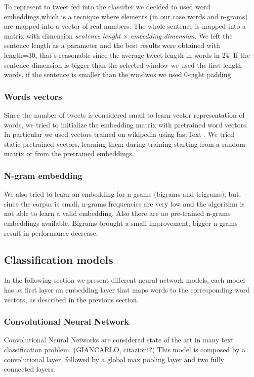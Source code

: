To represent to tweet fed into the classifier we decided to used word embeddings,which is a tecnique where elements (in our case words and n-grams) are mapped into a vector of real numbers.
The whole sentence is mapped into a matrix with dimension \emph{sentence lenght} $\times$ \emph{embedding dimension}.
We left the sentence length as a parameter and the best results were obtained with length=30, that's reasonable since the average tweet length in words in 24.
If the sentence dimension is bigger than the selected window we used the first length words, if the sentence is smaller than the windwos we used 0-right padding.

\subsubsection{Words vectors}
Since the number of tweets is considered small to learn vector representation of words, we tried to initialize the embedding matrix with pretrained word vectors.
In particular we used vectors trained on wikipedia using fastText \cite{bojanowski2016enriching}.
We tried static pretrained vectors, learning them during training starting from a random matrix or from the pretrained embeddings.

\subsubsection{N-gram embedding}
We also tried to learn an embedding for n-grams (bigrams and trigrams), but, since the corpus is small, n-grams frequencies are very low and the algorithm is not able to learn a valid embedding.
Also there are no pre-trained n-grams embeddings available.
Bigrams brought a small improvement, bigger n-grams result in performance decrease.



\subsection{Classification models} \label{subsec:classificationModel}
In the following section we present different neural network models, each model has as first layer an embedding layer that maps words to the corresponding word vectors, as described in the previous section.


\subsubsection{Convolutional Neural Network}
Convolutional Neural Networks are considered state of the art in many text classification problem. (GIANCARLO, citazioni?)
This model is composed by a convolutional layer, followed by a global max pooling layer and two fully connected layers.

